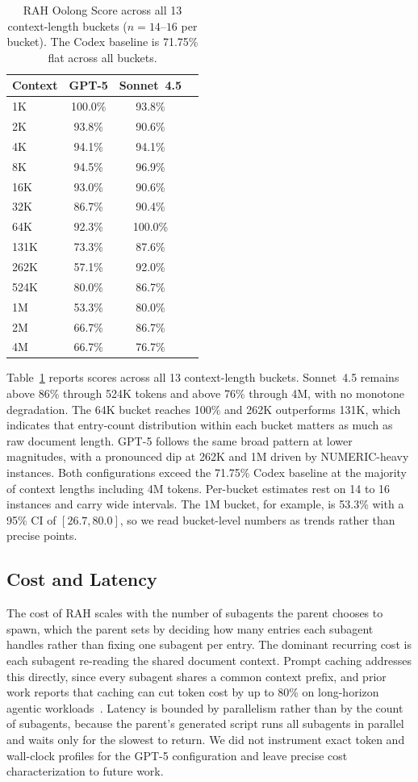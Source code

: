 \documentclass[sigconf,nonacm]{acmart}
\begin{document}
\begin{table}[t]
\centering
\caption{RAH Oolong Score across all 13 context-length buckets ($n{=}14$--$16$ per bucket).
  The Codex baseline is 71.75\% flat across all buckets.}
\label{tab:per_length}
\begin{tabular}{lccc}
\toprule
Context & GPT-5 & Sonnet~4.5 \\
\midrule
1K   & 100.0\% & 93.8\%  \\
2K   &  93.8\% & 90.6\%  \\
4K   &  94.1\% & 94.1\%  \\
8K   &  94.5\% & 96.9\%  \\
16K  &  93.0\% & 90.6\%  \\
32K  &  86.7\% & 90.4\%  \\
64K  &  92.3\% & 100.0\% \\
131K &  73.3\% & 87.6\%  \\
262K &  57.1\% & 92.0\%  \\
524K &  80.0\% & 86.7\%  \\
1M   &  53.3\% & 80.0\%  \\
2M   &  66.7\% & 86.7\%  \\
4M   &  66.7\% & 76.7\%  \\
\bottomrule
\end{tabular}
\end{table}

Table~\ref{tab:per_length} reports scores across all 13 context-length buckets.
Sonnet~4.5 remains above 86\% through 524K tokens and above 76\% through 4M,
with no monotone degradation. The 64K bucket reaches 100\% and 262K outperforms
131K, which indicates that entry-count distribution within each bucket matters as much
as raw document length. GPT-5 follows the same broad pattern at lower magnitudes,
with a pronounced dip at 262K and 1M driven by NUMERIC-heavy instances. Both
configurations exceed the 71.75\% Codex baseline at the majority of context
lengths including 4M tokens. Per-bucket estimates rest on 14 to 16 instances and carry
wide intervals. The 1M bucket, for example, is 53.3\% with a 95\% CI of $[26.7, 80.0]$,
so we read bucket-level numbers as trends rather than precise points.

\subsection{Cost and Latency}
The cost of RAH scales with the number of subagents the parent chooses to spawn, which the
parent sets by deciding how many entries each subagent handles rather than fixing one
subagent per entry. The dominant recurring cost is each subagent re-reading the shared
document context. Prompt caching addresses this directly, since every subagent shares a
common context prefix, and prior work reports that caching can cut token cost by up to
80\% on long-horizon agentic workloads~\cite{lumer2026don}. Latency is bounded by
parallelism rather than by the count of subagents, because the parent's generated script
runs all subagents in parallel and waits only for the slowest
to return. We did not instrument exact token and wall-clock profiles for the GPT-5
configuration and leave precise cost characterization to future work.
\end{document}
